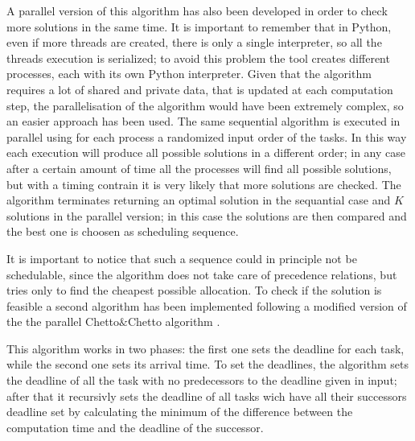 \documentclass[a4paper,12pt,oneside]{book}
\begin{document}
A parallel version of this algorithm has also been developed in order to check more solutions in the same time. It is important to remember that in Python, even if more threads are created, there is only a single interpreter, so all the threads execution is serialized; to avoid this problem the tool creates different processes, each with its own Python interpreter. Given that the algorithm requires a lot of shared and private data, that is updated at each computation step, the parallelisation of the algorithm would have been extremely complex, so an easier approach has been used. The same sequential algorithm is executed in parallel using for each process a randomized input order of the tasks. In this way each execution will produce all possible solutions in a different order; in any case after a certain amount of time all the processes will find all possible solutions, but with a timing contrain it is very likely that  more solutions are checked. The algorithm terminates returning an optimal solution in the sequantial case and $K$ solutions in the parallel version; in this case the solutions are then compared and the best one is choosen as scheduling sequence.

It is important to notice that such a sequence could in principle not be schedulable, since the algorithm does not take care of precedence relations, but tries only to find the cheapest possible allocation. To check if the solution is feasible a second algorithm has been implemented following a modified version of the the parallel Chetto$\&$Chetto algorithm \cite{bbw2}.

This algorithm works in two phases: the first one sets the deadline for each task, while the second one sets its arrival time. To set the deadlines, the algorithm sets the deadline of all the task with no predecessors to the deadline given in input; after that it recursivly sets the deadline of all tasks wich have all their successors deadline set by calculating the minimum of the difference between the computation time and the deadline of the successor. 
\end{document}
